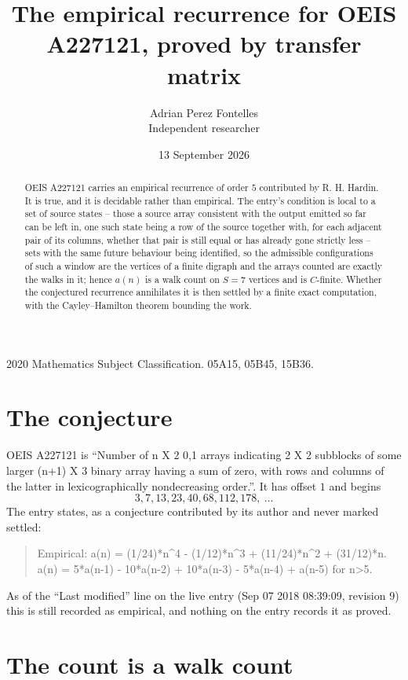 \documentclass[11pt,a4paper]{article}
\title{The empirical recurrence for OEIS A227121, proved by transfer matrix}
\author{Adrian Perez Fontelles\\ \small Independent researcher}
\date{13 September 2026}
\theoremstyle{plain}
\theoremstyle{definition}
\begin{document}
\maketitle

\begin{abstract}
OEIS A227121 carries an empirical recurrence of order $5$ contributed by R. H. Hardin. It is
true, and it is decidable rather than empirical. The entry's condition is local to a set of source states -- those a source array consistent with the output emitted so far can be left in, one such state being a row of the source together with, for each adjacent pair of its columns, whether that pair is still equal or has already gone strictly less -- sets with the same future behaviour being identified, so
the admissible configurations of such a window are the vertices of a finite digraph and the
arrays counted are exactly the walks in it; hence $a(n)$ is a walk count on $S=7$ vertices
and is $C$-finite. Whether the conjectured recurrence annihilates it is then settled by a
finite exact computation, with the Cayley--Hamilton theorem bounding the work.
\end{abstract}

\noindent\small 2020 Mathematics Subject Classification. 05A15, 05B45, 15B36.\normalsize

\section{The conjecture}

OEIS A227121 is ``Number of n X 2 0,1 arrays indicating 2 X 2 subblocks of some larger (n+1) X 3 binary array having a sum of zero, with rows and columns of the latter in lexicographically nondecreasing order.''. It has offset $1$ and begins
\[
3, 7, 13, 23, 40, 68, 112, 178,\ \dots
\]
The entry states, as a conjecture contributed by its author and never marked settled:
\begin{quote}
Empirical: a(n) = (1/24)*n\^{}4 - (1/12)*n\^{}3 + (11/24)*n\^{}2 + (31/12)*n. a(n) = 5*a(n-1) - 10*a(n-2) + 10*a(n-3) - 5*a(n-4) + a(n-5) for n>5.
\end{quote}
As of the ``Last modified'' line on the live entry (Sep 07 2018 08:39:09, revision 9) this is still
recorded as empirical, and nothing on the entry records it as proved.

\section{The count is a walk count}
\end{document}
